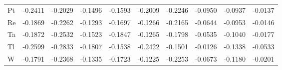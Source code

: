 \begin{table}[htbp]
{\begin{tabular}{l *{9}{l}}
      Pt & -0.2411 & -0.2029 & -0.1496 & -0.1593 & -0.2009 & -0.2246 & -0.0950 & -0.0937 & -0.0137 \\
      Re & -0.1869 & -0.2262 & -0.1293 & -0.1697 & -0.1266 & -0.2165 & -0.0644 & -0.0953 & -0.0146 \\
      Ta & -0.1872 & -0.2532 & -0.1523 & -0.1847 & -0.1265 & -0.1798 & -0.0535 & -0.1040 & -0.0177 \\
      Tl & -0.2599 & -0.2833 & -0.1807 & -0.1538 & -0.2422 & -0.1501 & -0.0126 & -0.1338 & -0.0533 \\
      W  & -0.1791 & -0.2368 & -0.1335 & -0.1723 & -0.1225 & -0.2253 & -0.0673 & -0.1180 & -0.0201 \\
      \bottomrule
    \end{tabular}
  }
\end{table}

